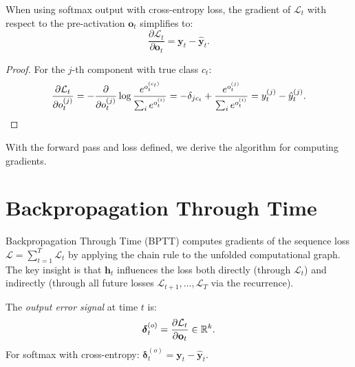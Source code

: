 \documentclass[11pt,a4paper]{article}
\begin{document}
\begin{proposition}
\label{prop:softmax-ce}
When using softmax output with cross-entropy loss, the gradient of
$\mathcal{L}_t$ with respect to the pre-activation $\mathbf{o}_t$
simplifies to:
\begin{equation}
  \frac{\partial \mathcal{L}_t}{\partial \mathbf{o}_t}
    = \mathbf{y}_t - \hat{\mathbf{y}}_t.
  \label{eq:softmax-grad}
\end{equation}
\end{proposition}

\begin{proof}
For the $j$-th component with true class $c_t$:
\[
  \frac{\partial \mathcal{L}_t}{\partial o_t^{(j)}}
    = -\frac{\partial}{\partial o_t^{(j)}}
      \log \frac{e^{o_t^{(c_t)}}}{\sum_i e^{o_t^{(i)}}}
    = -\delta_{j c_t} + \frac{e^{o_t^{(j)}}}{\sum_i e^{o_t^{(i)}}}
    = y_t^{(j)} - \hat{y}_t^{(j)}.  \qedhere
\]
\end{proof}

With the forward pass and loss defined, we derive the algorithm
for computing gradients.

\section{Backpropagation Through Time}
\label{sec:bptt}

Backpropagation Through Time (BPTT) computes gradients of the
sequence loss $\mathcal{L} = \sum_{t=1}^T \mathcal{L}_t$ by
applying the chain rule to the unfolded computational graph.  The
key insight is that $\mathbf{h}_t$ influences the loss both directly
(through $\mathcal{L}_t$) and indirectly (through all future losses
$\mathcal{L}_{t+1}, \ldots, \mathcal{L}_T$ via the recurrence).

\begin{definition}
\label{def:output-error}
The \emph{output error signal} at time $t$ is:
\begin{equation}
  \boldsymbol{\delta}_t^{(o)} = \frac{\partial \mathcal{L}_t}
    {\partial \mathbf{o}_t} \in \mathbb{R}^k.
  \label{eq:output-error}
\end{equation}
For softmax with cross-entropy:
$\boldsymbol{\delta}_t^{(o)} = \mathbf{y}_t - \hat{\mathbf{y}}_t$.
\end{definition}
\end{document}
